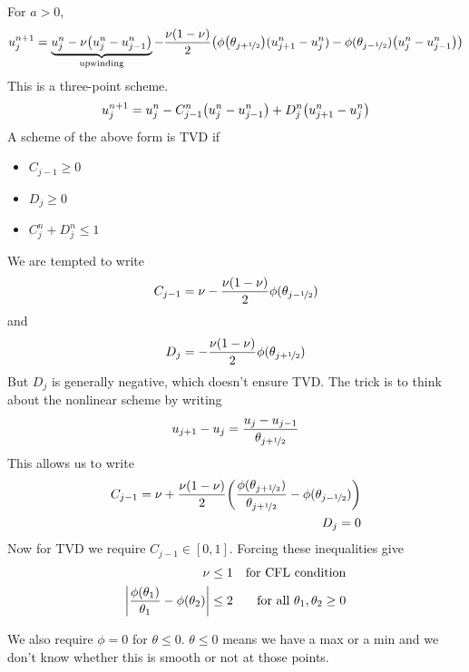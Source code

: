 \documentclass{article}
\newcommand{\half}{\nicefrac{1}{2}}
\begin{document}
    For $a > 0$,
    \begin{align*}
        u_j^{n+1} = \underbrace{u_j^n - \nu\qty(u_j^n - u_{j-1}^n)}_\text{upwinding} -\frac{\nu\qty(1 -\nu)}{2}\qty(\phi\qty(\theta_{j+\half})(u_{j+1}^n - u_j^n) - \phi(\theta_{j-\half})\qty(u_j^n - u_{j-1}^n))
    \end{align*}
    This is a three-point scheme.
    \begin{align*}
        u_j^{n+1} = u_j^n - C_{j-1}^n\qty(u_j^n - u_{j-1}^n) + D_j^n\qty(u_{j+1}^n - u_j^n)
    \end{align*}
    A scheme of the above form is TVD if
    \begin{itemize}
        \item $C_{j-1} \geq 0$
        \item $D_j \geq 0$
        \item $C_j^n + D_j^n \leq 1$
    \end{itemize}
    We are tempted to write
    \begin{align*}
        C_{j-1} = \nu - \frac{\nu\qty(1 - \nu)}{2}\phi(\theta_{j-\half})
    \end{align*}
    and
    \begin{align*}
        D_j = -\frac{\nu(1 - \nu)}{2}\phi(\theta_{j+\half})
    \end{align*}
    But $D_j$ is generally negative, which doesn't ensure TVD.  The trick is to think about the nonlinear scheme by writing
    \begin{align*}
        u_{j+1} - u_j = \frac{u_j - u_{j-1}}{\theta_{j+\half}}
    \end{align*}
    This allows us to write
    \begin{align*}
        C_{j-1} = \nu + \frac{\nu(1 - \nu)}{2}\qty(\frac{\phi(\theta_{j+\half})}{\theta_{j+\half}} - \phi(\theta_{j-\half})) \\ D_j = 0
    \end{align*}
    Now for TVD we require $C_{j-1} \in [0,1]$.  Forcing these inequalities give
    \begin{align*}
        \nu &\leq 1 & \text{for CFL condition} \\
        \abs{\frac{\phi(\theta_1)}{\theta_1} - \phi(\theta_2)} &\leq 2 & \text{for all $\theta_1,\theta_2\geq 0$}
    \end{align*}
    
    We also require $\phi = 0$ for $\theta \leq 0$.  $\theta \leq 0$ means we have a max or a min and we don't know whether this is smooth or not at those points.
\end{document}
